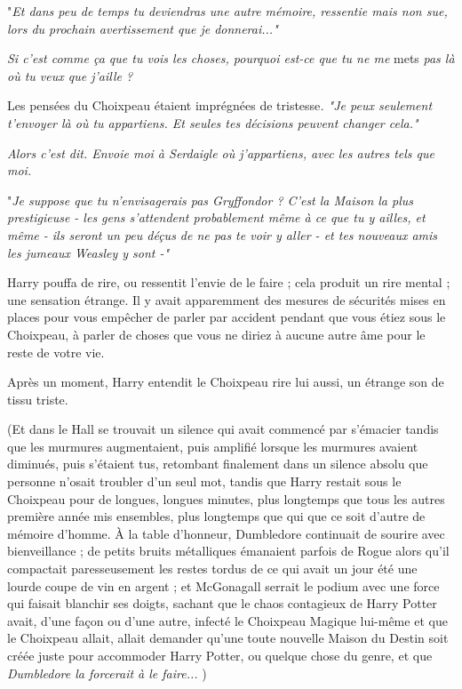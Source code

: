 "\emph{Et dans peu de temps tu deviendras une autre mémoire, ressentie mais non sue, lors du prochain avertissement que je donnerai..."} 

\emph{Si c'est comme ça que tu vois les choses, pourquoi est-ce que tu ne me } mets\emph{ pas là où tu veux que j'aille ?} 

Les pensées du Choixpeau étaient imprégnées de tristesse\emph{. "Je peux seulement t'envoyer là où tu appartiens. Et seules tes décisions peuvent changer cela."} 

\emph{Alors c'est dit. Envoie moi à Serdaigle où j'appartiens, avec les autres tels que moi.} 

"\emph{Je suppose que tu n'envisagerais pas Gryffondor ? C'est la Maison la plus prestigieuse - les gens s'attendent probablement même à ce que tu y ailles, et même - ils seront un peu déçus de ne pas te voir y aller - et tes nouveaux amis les jumeaux Weasley y sont -"} 

Harry pouffa de rire, ou ressentit l'envie de le faire ; cela produit un rire mental ; une sensation étrange. Il y avait apparemment des mesures de sécurités mises en places pour vous empêcher de parler par accident pendant que vous étiez sous le Choixpeau, à parler de choses que vous ne diriez à aucune autre âme pour le reste de votre vie.

Après un moment, Harry entendit le Choixpeau rire lui aussi, un étrange son de tissu triste.

(Et dans le Hall se trouvait un silence qui avait commencé par s'émacier tandis que les murmures augmentaient, puis amplifié lorsque les murmures avaient diminués, puis s'étaient tus, retombant finalement dans un silence absolu que personne n'osait troubler d'un seul mot, tandis que Harry restait sous le Choixpeau pour de longues, longues minutes, plus longtemps que tous les autres première année mis ensembles, plus longtemps que qui que ce soit d'autre de mémoire d'homme. À la table d'honneur, Dumbledore continuait de sourire avec bienveillance ; de petits bruits métalliques émanaient parfois de Rogue alors qu'il compactait paresseusement les restes tordus de ce qui avait un jour été une lourde coupe de vin en argent ; et McGonagall serrait le podium avec une force qui faisait blanchir ses doigts, sachant que le chaos contagieux de Harry Potter avait, d'une façon ou d'une autre, infecté le Choixpeau Magique lui-même et que le Choixpeau allait, allait demander qu'une toute nouvelle Maison du Destin soit créée juste pour accommoder Harry Potter, ou quelque chose du genre, et que \emph{Dumbledore la forcerait à le faire...} )

